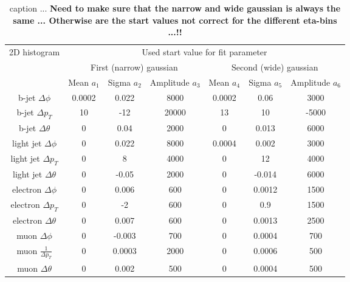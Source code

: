 \begin{table}[h!]
 \centering
 \begin{tabular}{|c|c|c|c|c|c|c|}
  \hline
  \multirow{2}{*}{2D histogram}	& \multicolumn{6}{|c|}{Used start value for fit parameter}	  	\\
				& \multicolumn{3}{|c}{First (narrow) gaussian} 		& \multicolumn{3}{c|}{Second (wide) gaussian}		\\
				&  Mean $a_1$	& Sigma $a_2$ 	& Amplitude $a_3$ 	& Mean $a_4$ 	& Sigma $a_5$ 	& Amplitude $a_6$ 	\\
  \hline
    b-jet $\Delta \phi$ 	& 0.0002	& 0.022		&	8000		& 	0.0002	& 	0.06	&	3000		\\
    b-jet $\Delta p_T$ 		& 10		& -12		&	20000		& 	13	& 	10	&	-5000		\\
    b-jet $\Delta \theta$  	& 0		& 0.04		&	2000		& 	0	& 	0.013	&	6000		\\
  \hline
    light jet $\Delta \phi$  	& 0		& 0.022		&	8000		& 	0.0004	& 	0.002	&	3000		\\
    light jet $\Delta p_T$  	& 0		& 8		&	4000		& 	0	&	12	&	4000		\\
    light jet $\Delta \theta$ 	& 0		& -0.05		&	2000		& 	0	&	-0.014	&	6000		\\
  \hline 
    electron $\Delta \phi$ 	& 0		& 0.006		& 	600 		&	0	&	0.0012	&	1500		\\
    electron $\Delta p_T$  	& 0		& -2		& 	600		&	0	&	0.9	&	1500		\\
    electron $\Delta \theta$ 	& 0		& 0.007		& 	600		&	0	&	0.0013	&	2500		\\
  \hline
    muon $\Delta \phi$ 		& 0		& -0.003	& 	700		&	0	&	0.0004	&	700		\\
    muon $\frac{1}{\Delta p_T}$ & 0		& 0.0003	& 	2000		&	0	&	0.0006	&	500		\\
    muon $\Delta \theta$ 	& 0		& 0.002		& 	500		&	0	&	0.0004	&	500		\\
  \hline
 \end{tabular} 
 \caption{caption ... \textbf{Need to make sure that the narrow and wide gaussian is always the same ... Otherwise are the start values not correct for the different eta-bins ...!!}} \label{table::StartValues}
\end{table}

